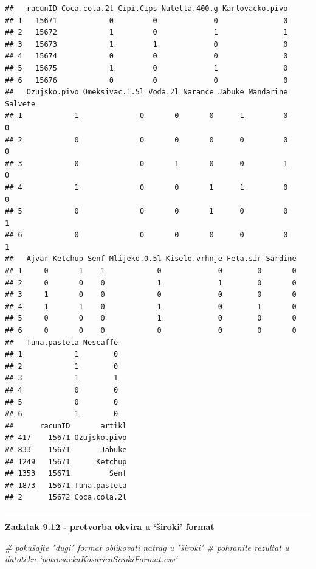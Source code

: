 \documentclass[]{book}
\newenvironment{Shaded}{\begin{snugshade}}{\end{snugshade}}
\newcommand{\CommentTok}[1]{\textcolor[rgb]{0.56,0.35,0.01}{\textit{#1}}}
\theoremstyle{definition}
\theoremstyle{definition}
\theoremstyle{definition}
\theoremstyle{remark}
\begin{document}
\begin{verbatim}
##   racunID Coca.cola.2l Cipi.Cips Nutella.400.g Karlovacko.pivo
## 1   15671            0         0             0               0
## 2   15672            1         0             1               1
## 3   15673            1         1             0               0
## 4   15674            0         0             0               0
## 5   15675            1         0             1               0
## 6   15676            0         0             0               0
##   Ozujsko.pivo Omeksivac.1.5l Voda.2l Narance Jabuke Mandarine Salvete
## 1            1              0       0       0      1         0       0
## 2            0              0       0       0      0         0       0
## 3            0              0       1       0      0         1       0
## 4            1              0       0       1      1         0       0
## 5            0              0       0       1      0         0       1
## 6            0              0       0       0      0         0       1
##   Ajvar Ketchup Senf Mlijeko.0.5l Kiselo.vrhnje Feta.sir Sardine
## 1     0       1    1            0             0        0       0
## 2     0       0    0            1             1        0       0
## 3     1       0    0            0             0        0       0
## 4     1       1    0            1             0        1       0
## 5     0       0    0            1             0        0       0
## 6     0       0    0            0             0        0       0
##   Tuna.pasteta Nescaffe
## 1            1        0
## 2            1        0
## 3            1        1
## 4            0        0
## 5            0        0
## 6            1        0
##      racunID       artikl
## 417    15671 Ozujsko.pivo
## 833    15671       Jabuke
## 1249   15671      Ketchup
## 1353   15671         Senf
## 1873   15671 Tuna.pasteta
## 2      15672 Coca.cola.2l
\end{verbatim}

\begin{center}\rule{0.5\linewidth}{\linethickness}\end{center}

\textbf{Zadatak 9.12 - pretvorba okvira u `široki' format}

\begin{Shaded}
\begin{Highlighting}[]
\CommentTok{# pokušajte "dugi" format oblikovati natrag u "široki"}
\CommentTok{# pohranite rezultat u datoteku `potrosackaKosaricaSirokiFormat.csv`}
\end{Highlighting}
\end{Shaded}
\end{document}
